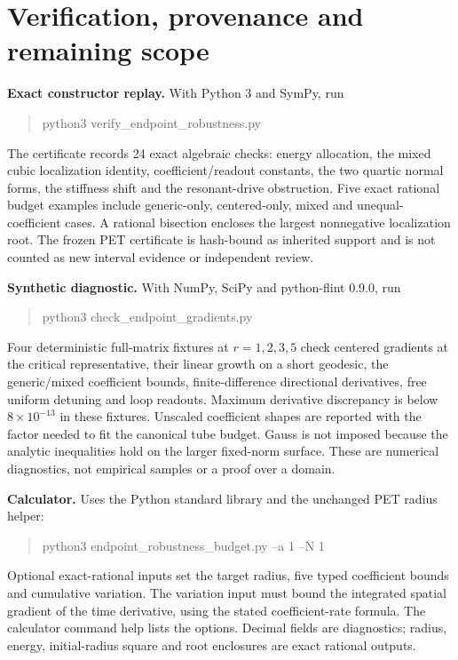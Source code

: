 \documentclass[11pt,a4paper]{article}
\begin{document}
\section{Verification, provenance and remaining scope}
\textbf{Exact constructor replay.} With Python 3 and SymPy, run
\begin{quote}\ttfamily python3 verify\_endpoint\_robustness.py\end{quote}
The certificate records 24 exact algebraic checks: energy allocation, the mixed cubic localization identity, coefficient/readout constants, the two quartic normal forms, the stiffness shift and the resonant-drive obstruction. Five exact rational budget examples include generic-only, centered-only, mixed and unequal-coefficient cases. A rational bisection encloses the largest nonnegative localization root. The frozen PET certificate is hash-bound as inherited support and is not counted as new interval evidence or independent review.

\textbf{Synthetic diagnostic.} With NumPy, SciPy and python-flint 0.9.0, run
\begin{quote}\ttfamily python3 check\_endpoint\_gradients.py\end{quote}
Four deterministic full-matrix fixtures at $r=1,2,3,5$ check centered gradients at the critical representative, their linear growth on a short geodesic, the generic/mixed coefficient bounds, finite-difference directional derivatives, free uniform detuning and loop readouts. Maximum derivative discrepancy is below $8\times10^{-13}$ in these fixtures. Unscaled coefficient shapes are reported with the factor needed to fit the canonical tube budget. Gauss is not imposed because the analytic inequalities hold on the larger fixed-norm surface. These are numerical diagnostics, not empirical samples or a proof over a domain.

\textbf{Calculator.} Uses the Python standard library and the unchanged PET radius helper:
\begin{quote}\ttfamily python3 endpoint\_robustness\_budget.py --a 1 --N 1\end{quote}
Optional exact-rational inputs set the target radius, five typed coefficient bounds and cumulative variation. The variation input must bound the integrated spatial gradient of the time derivative, using the stated coefficient-rate formula. The calculator command help lists the options. Decimal fields are diagnostics; radius, energy, initial-radius square and root enclosures are exact rational outputs.
\end{document}
